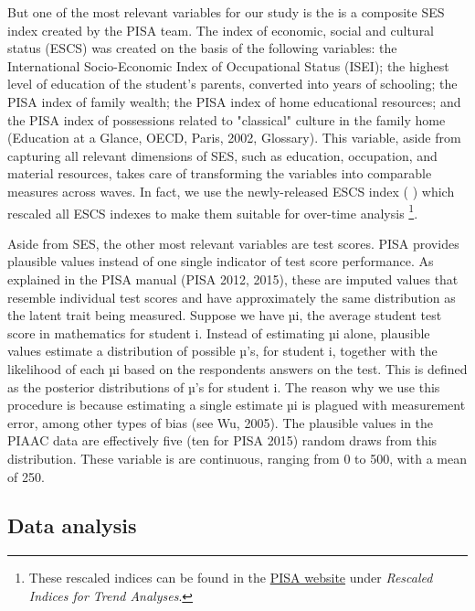 \documentclass[11pt, a4paper]{article}\usepackage[]{graphicx}\usepackage[]{color}
\begin{document}
But one of the most relevant variables for our study is the is a composite SES index created by the PISA team. The index of economic, social and cultural status (ESCS) was created on the basis of the following variables: the International Socio-Economic Index of Occupational Status (ISEI); the highest level of education of the student’s parents, converted into years of schooling; the PISA index of family wealth; the PISA index of home educational resources; and the PISA index of possessions related to "classical" culture in the family home (Education at a Glance, OECD, Paris, 2002, Glossary). This variable, aside from capturing all relevant dimensions of SES, such as education, occupation, and material resources, takes care of transforming the variables into comparable measures across waves. In fact, we use the newly-released ESCS index (%
) which rescaled all ESCS indexes to make them suitable for over-time analysis \footnote{These rescaled indices can be found in the \href{http://www.oecd.org/pisa/data/2015database/}{PISA website} under \emph{Rescaled Indices for Trend Analyses}.}.

Aside from SES, the other most relevant variables are test scores. PISA provides plausible values instead of one single indicator of test score performance. As explained in the PISA manual (PISA 2012, 2015), these are imputed values that resemble individual test scores and have approximately the same distribution as the latent trait being measured. Suppose we have µi, the average student test score in mathematics for student i. Instead of estimating µi alone, plausible values estimate a distribution of possible µ’s, for student i, together with the likelihood of each µi based on the respondents answers on the test. This is defined as the posterior distributions of µ’s for student i. The reason why we use this procedure is because estimating a single estimate µi is plagued with measurement error, among other types of bias (see Wu, 2005). The plausible values in the PIAAC data are effectively five (ten for PISA 2015) random draws from this distribution. These variable is are continuous, ranging from 0 to 500, with a mean of 250.

\subsection{Data analysis}
\end{document}
